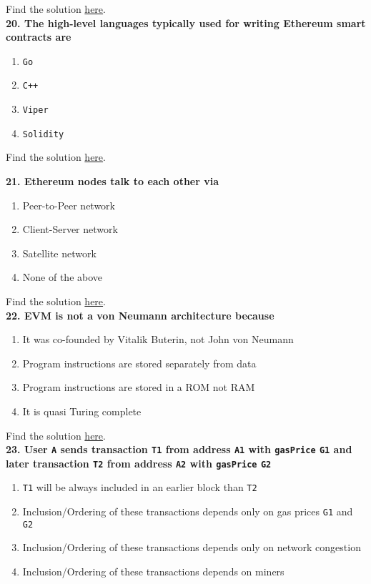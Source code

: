 Find the solution \hyperref[sec:exam1_q19]{here}.\\

\textbf{20. The high-level languages typically used for writing Ethereum smart contracts are}

\begin{enumerate}[label=\Alph*.]
    \item\verb|Go|
    \item\verb|C++|
    \item\verb|Viper|
    \item\verb|Solidity|
\end{enumerate}

Find the solution \hyperref[sec:exam1_q20]{here}.\\

\pagebreak

\textbf{21. Ethereum nodes talk to each other via}

\begin{enumerate}[label=\Alph*.]
    \item Peer-to-Peer network
    \item Client-Server network
    \item Satellite network
    \item None of the above
\end{enumerate}

Find the solution \hyperref[sec:exam1_q21]{here}.\\

\textbf{22. EVM is not a von Neumann architecture because}

\begin{enumerate}[label=\Alph*.]
    \item It was co-founded by Vitalik Buterin, not John von Neumann
    \item Program instructions are stored separately from data
    \item Program instructions are stored in a ROM not RAM
    \item It is quasi Turing complete
\end{enumerate}

Find the solution \hyperref[sec:exam1_q22]{here}.\\

\textbf{23. User \texttt{A} sends transaction \texttt{T1} from address \texttt{A1} with \texttt{gasPrice} \texttt{G1} and later transaction \texttt{T2} from address \texttt{A2} with \texttt{gasPrice} \texttt{G2}}

\begin{enumerate}[label=\Alph*.]
    \item\verb|T1| will be always included in an earlier block than \verb|T2|
    \item Inclusion/Ordering of these transactions depends only on gas prices \verb|G1| and \verb|G2|
    \item Inclusion/Ordering of these transactions depends only on network congestion
    \item Inclusion/Ordering of these transactions depends on miners
\end{enumerate}

